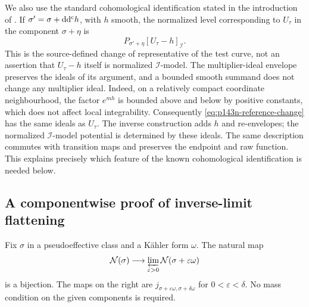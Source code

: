 We also use the standard cohomological identification stated in the
introduction of \cite[p.~3, after the definition of the projective
limit]{DXZ23}. If \(\sigma'=\sigma+\mathrm d\mathrm d^{\mathrm c} h\), with \(h\) smooth,
the normalized level corresponding to \(U_\tau\) in the component
\(\sigma+\eta\) is
\begin{equation}\label{eq:p143n-reference-change}
 P_{\sigma'+\eta}[U_\tau-h]_{\mathcal I}.
\end{equation}
This is the source-defined change of representative of the test curve,
not an assertion that \(U_\tau-h\) itself is normalized
\(\mathcal I\)-model. The multiplier-ideal envelope preserves the
ideals of its argument, and a bounded smooth summand does not change
any multiplier ideal. Indeed, on a relatively compact coordinate
neighbourhood, the factor \(e^{mh}\) is bounded above and below by
positive constants, which does not affect local integrability.
Consequently \eqref{eq:p143n-reference-change} has the same ideals as
\(U_\tau\). The inverse construction adds \(h\) and re-envelopes;
the normalized \(\mathcal I\)-model potential is determined by these
ideals. The same description commutes with transition maps and preserves
the endpoint and raw function. This explains precisely which feature
of the known cohomological identification is needed below.

\subsection{A componentwise proof of inverse-limit flattening}

\begin{lemma}\label{lem:p143n-flatten}
Fix \(\sigma\) in a pseudoeffective class and a K\"ahler form
\(\omega\). The natural map
\[
 \mathcal N(\sigma)\longrightarrow
 \varprojlim_{\varepsilon>0}\mathcal N(\sigma+\varepsilon\omega)
\]
is a bijection. The maps on the right are
\(j_{\sigma+\varepsilon\omega,\sigma+\delta\omega}\) for
\(0<\varepsilon<\delta\). No mass condition on the given components
is required.
\end{lemma}

